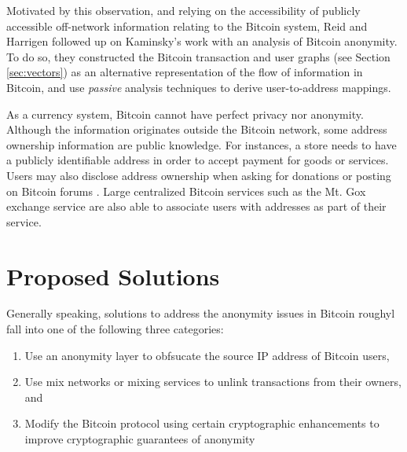 Motivated by this observation, and relying on the accessibility of publicly accessible off-network information relating to the Bitcoin system, Reid and Harrigen \cite{ReidHarrigan13} followed up on Kaminsky's work with an analysis of Bitcoin anonymity. To do so, they constructed the Bitcoin transaction and user graphs (see Section \ref{sec:vectors}) as an alternative representation of the flow of information in Bitcoin, and use \emph{passive} analysis techniques to derive user-to-address mappings. 


As a currency system, Bitcoin cannot have perfect privacy nor anonymity. Although the information originates outside the Bitcoin network, some address ownership information are public knowledge. For instances, a store needs to have a publicly identifiable address in order to accept payment for goods or services. Users may also disclose address ownership when asking for donations or posting on Bitcoin forums \cite{Fistful12}. Large centralized Bitcoin services such as the Mt. Gox exchange service are also able to associate users with addresses as part of their service.


\cite{Androulaki12-privacy}


\section{Proposed Solutions}
Generally speaking, solutions to address the anonymity issues in Bitcoin roughyl fall into one of the following three categories:
\begin{enumerate}
	\item Use an anonymity layer to obfsucate the source IP address of Bitcoin users,
	\item Use mix networks or mixing services to unlink transactions from their owners, and
	\item Modify the Bitcoin protocol using certain cryptographic enhancements to improve cryptographic guarantees of anonymity
\end{enumerate}

